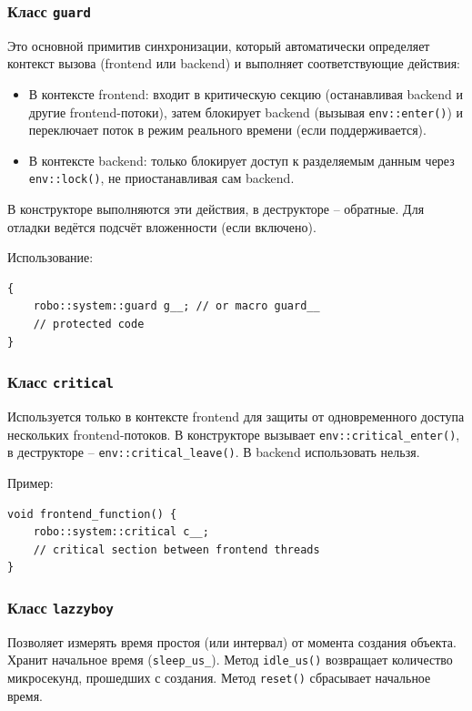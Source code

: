 \documentclass[a4paper,12pt]{article}
\begin{document}
\subsubsection{Класс \texttt{guard}}

Это основной примитив синхронизации, который автоматически определяет контекст вызова (frontend или backend) и выполняет соответствующие действия:
\begin{itemize}
    \item В контексте frontend: входит в критическую секцию (останавливая backend и другие frontend-потоки), затем блокирует backend (вызывая \texttt{env::enter()}) и переключает поток в режим реального времени (если поддерживается).
    \item В контексте backend: только блокирует доступ к разделяемым данным через \texttt{env::lock()}, не приостанавливая сам backend.
\end{itemize}
В конструкторе выполняются эти действия, в деструкторе -- обратные. Для отладки ведётся подсчёт вложенности (если включено).

Использование:
\begin{lstlisting}
{
    robo::system::guard g__; // or macro guard__
    // protected code
}
\end{lstlisting}

\subsubsection{Класс \texttt{critical}}

Используется только в контексте frontend для защиты от одновременного доступа нескольких frontend-потоков. В конструкторе вызывает \texttt{env::critical\_enter()}, в деструкторе -- \texttt{env::critical\_leave()}. В backend использовать нельзя.

Пример:
\begin{lstlisting}
void frontend_function() {
    robo::system::critical c__;
    // critical section between frontend threads
}
\end{lstlisting}

\subsubsection{Класс \texttt{lazzyboy}}

Позволяет измерять время простоя (или интервал) от момента создания объекта. Хранит начальное время (\texttt{sleep\_us\_}). Метод \texttt{idle\_us()} возвращает количество микросекунд, прошедших с создания. Метод \texttt{reset()} сбрасывает начальное время.
\end{document}
